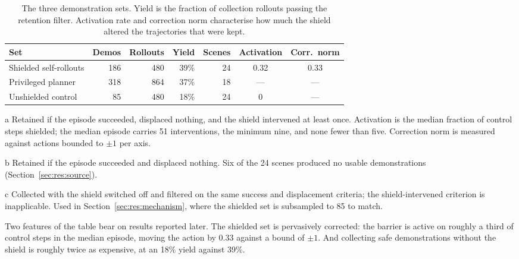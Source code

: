 \documentclass[a4paper,11pt]{report}
\begin{document}
\begin{table}[htbp]
\centering
\begin{threeparttable}
\caption[Composition of the demonstration sets]{%
  The three demonstration sets. Yield is the fraction of collection rollouts passing the retention
  filter. Activation rate and correction norm characterise how much the shield altered the
  trajectories that were kept.}
\label{tab:demo_sets}
\begin{tabular}{lrrrrcc}
\toprule
\textbf{Set} & \textbf{Demos} & \textbf{Rollouts} & \textbf{Yield} & \textbf{Scenes}
  & \textbf{Activation} & \textbf{Corr.\ norm} \\
\midrule
Shielded self-rollouts\tnote{a}  & 186 & 480 & 39\% & 24 & 0.32 & 0.33 \\
Privileged planner\tnote{b}      & 318 & 864 & 37\% & 18 & ---  & ---  \\
Unshielded control\tnote{c}      & \phantom{0}85 & 480 & 18\% & 24 & 0    & ---  \\
\bottomrule
\end{tabular}
\begin{tablenotes}[flushleft]\footnotesize
\item[a] Retained if the episode succeeded, displaced nothing, and the shield intervened at least
  once. Activation is the median fraction of control steps shielded; the median episode carries 51
  interventions, the minimum nine, and none fewer than five. Correction norm is measured against
  actions bounded to $\pm 1$ per axis.
\item[b] Retained if the episode succeeded and displaced nothing. Six of the 24 scenes produced no
  usable demonstrations (Section~\ref{sec:res:source}).
\item[c] Collected with the shield switched off and filtered on the same success and displacement
  criteria; the shield-intervened criterion is inapplicable. Used in
  Section~\ref{sec:res:mechanism}, where the shielded set is subsampled to 85 to match.
\end{tablenotes}
\end{threeparttable}
\end{table}

Two features of the table bear on results reported later. The shielded set is pervasively
corrected: the barrier is active on roughly a third of control steps in the median episode, moving
the action by 0.33 against a bound of $\pm 1$. And collecting safe demonstrations without the
shield is roughly twice as expensive, at an 18\% yield against 39\%.
\end{document}
